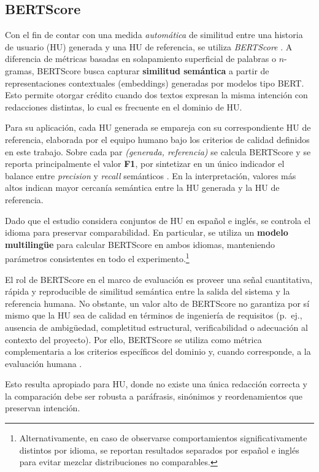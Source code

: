 \subsection{BERTScore}
\label{sec:bertscore}

Con el fin de contar con una medida \textit{automática} de similitud entre una historia de usuario (HU) generada y una HU de referencia, se utiliza \textit{BERTScore} \cite{zhang2020bertscore}. A diferencia de métricas basadas en solapamiento superficial de palabras o $n$-gramas, BERTScore busca capturar \textbf{similitud semántica} a partir de representaciones contextuales (embeddings) generadas por modelos tipo BERT. Esto permite otorgar crédito cuando dos textos expresan la misma intención con redacciones distintas, lo cual es frecuente en el dominio de HU.

Para su aplicación, cada HU generada se empareja con su correspondiente HU de referencia, elaborada por el equipo humano bajo los criterios de calidad definidos en este trabajo. Sobre cada par \textit{(generada, referencia)} se calcula BERTScore y se reporta principalmente el valor \textbf{F1}, por sintetizar en un único indicador el balance entre \textit{precision} y \textit{recall} semánticos \cite{zhang2020bertscore}. En la interpretación, valores más altos indican mayor cercanía semántica entre la HU generada y la HU de referencia.

Dado que el estudio considera conjuntos de HU en español e inglés, se controla el idioma para preservar comparabilidad. En particular, se utiliza un \textbf{modelo multilingüe} para calcular BERTScore en ambos idiomas, manteniendo parámetros consistentes en todo el experimento.\footnote{Alternativamente, en caso de observarse comportamientos significativamente distintos por idioma, se reportan resultados separados por español e inglés para evitar mezclar distribuciones no comparables.}

El rol de BERTScore en el marco de evaluación es proveer una señal cuantitativa, rápida y reproducible de similitud semántica entre la salida del sistema y la referencia humana. No obstante, un valor alto de BERTScore no garantiza por sí mismo que la HU sea de calidad en términos de ingeniería de requisitos (p.\ ej., ausencia de ambigüedad, completitud estructural, verificabilidad o adecuación al contexto del proyecto). Por ello, BERTScore se utiliza como métrica complementaria a los criterios específicos del dominio y, cuando corresponde, a la evaluación humana \cite{yu2026genai_quality}.

Esto resulta apropiado para HU, donde no existe una única redacción correcta y la comparación debe ser robusta a paráfrasis, sinónimos y reordenamientos que preservan intención.